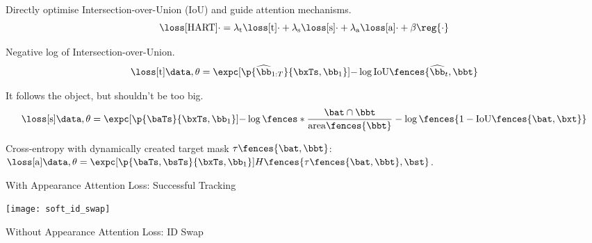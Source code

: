\vspace{.5\baselineskip}
    \centering
    Directly optimise Intersection-over-Union (IoU) and guide attention mechanisms.
\begin{equation*}
\loss[\mathrm{HART}]{\cdot} = \lambda_{\mathrm{t}} \loss[\mathrm{t}]{\cdot} + \lambda_{\mathrm{s}} \loss[\mathrm{s}]{\cdot} + \lambda_{\mathrm{a}} \loss[\mathrm{a}]{\cdot} + \beta \reg{ \cdot }
\end{equation*}

\begin{description}[leftmargin=\parindent,labelsep=1em]

\item[Tracking:] Negative log of Intersection-over-Union.
\begin{equation*}
    \loss[\mathrm{t}]{\data, \theta} = \expc[\p{\widehat{\bb}_{1:T}}{\bxTs, \bb_1}]{ -\log \mathrm{IoU} \fences{\widehat{\bb}_t, \bbt}}
\end{equation*}

\item[Spatial Attention:] It follows the object, but shouldn't be too big.
\begin{equation*}
    \loss[\mathrm{s}]{\data, \theta} = \expc[\p{\baTs}{\bxTs, \bb_1}]{ -\log \fences*{\frac{ \bat \cap \bbt }{\mathrm{area}\fences{\bbt}} } -\log \fences { 1 - \mathrm{IoU} \fences{\bat, \bxt} } }
\end{equation*}

\item[Appearance Attention:] Cross-entropy with dynamically created target mask $\tau \fences { \bat, \bbt }$:
$\loss[\mathrm{a}]{\data, \theta} =   \expc[\p{\baTs, \bsTs}{\bxTs, \bb_1}]{ H \fences{ \tau \fences { \bat, \bbt }, \bst  } }$.



\begin{minipage}[c]{.3\textwidth}
    \centering
    \vspace{0.75em}
    \caption*{\large With Appearance Attention Loss: Successful Tracking}
    \texttt{[image: soft\_id\_swap]}
    \caption*{\large Without Appearance Attention Loss: ID Swap}
\end{minipage}
\end{description}

